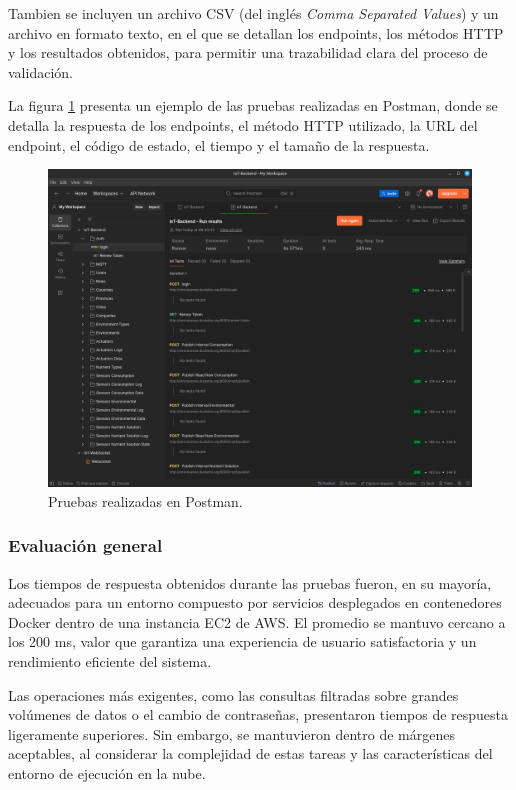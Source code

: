 Tambien se incluyen un archivo CSV (del inglés \textit{Comma Separated Values})
y un archivo en formato texto, en el que se detallan los endpoints, los métodos
HTTP y los resultados obtenidos, para permitir una trazabilidad clara del
proceso de validación.

La figura \ref{fig:postman} presenta un ejemplo de las pruebas realizadas en
Postman, donde se detalla la respuesta de los endpoints, el método HTTP
utilizado, la URL del endpoint, el código de estado, el tiempo y el tamaño de
la respuesta.

\begin{figure}[H]
    \centering
    \includegraphics[width=\textwidth]{Images/38_postman.png}
    \caption[Pruebas realizadas en Postman]{Pruebas realizadas en Postman.}
    \label{fig:postman}
\end{figure}

\subsubsection{Evaluación general}

Los tiempos de respuesta obtenidos durante las pruebas fueron, en su mayoría,
adecuados para un entorno compuesto por servicios desplegados en contenedores
Docker dentro de una instancia EC2 de AWS. El promedio se mantuvo cercano a los
200 ms, valor que garantiza una experiencia de usuario satisfactoria
\cite{GoodAPITime} y un rendimiento eficiente del sistema.

Las operaciones más exigentes, como las consultas filtradas sobre grandes
volúmenes de datos o el cambio de contraseñas, presentaron tiempos de respuesta
ligeramente superiores. Sin embargo, se mantuvieron dentro de márgenes
aceptables, al considerar la complejidad de estas tareas y las características
del entorno de ejecución en la nube.

